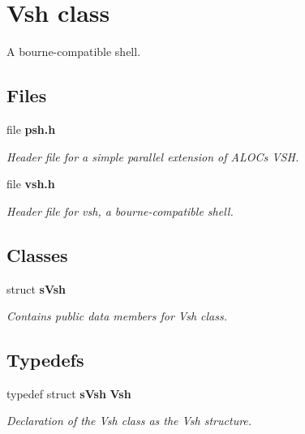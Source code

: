 \section{Vsh class}
\label{a00027}


A bourne-\/compatible shell.  


\subsection*{Files}
\begin{DoxyCompactItemize}
\item 
file {\bf psh.\+h}
\begin{DoxyCompactList}\small\item\em Header file for a simple parallel extension of A\+L\+O\+C\textquotesingle{}s V\+S\+H. \end{DoxyCompactList}\item 
file {\bf vsh.\+h}
\begin{DoxyCompactList}\small\item\em Header file for vsh, a bourne-\/compatible shell. \end{DoxyCompactList}\end{DoxyCompactItemize}
\subsection*{Classes}
\begin{DoxyCompactItemize}
\item 
struct {\bf s\+Vsh}
\begin{DoxyCompactList}\small\item\em Contains public data members for Vsh class. \end{DoxyCompactList}\end{DoxyCompactItemize}
\subsection*{Typedefs}
\begin{DoxyCompactItemize}
\item 
typedef struct {\bf s\+Vsh} {\bf Vsh}
\begin{DoxyCompactList}\small\item\em Declaration of the Vsh class as the Vsh structure. \end{DoxyCompactList}\end{DoxyCompactItemize}
